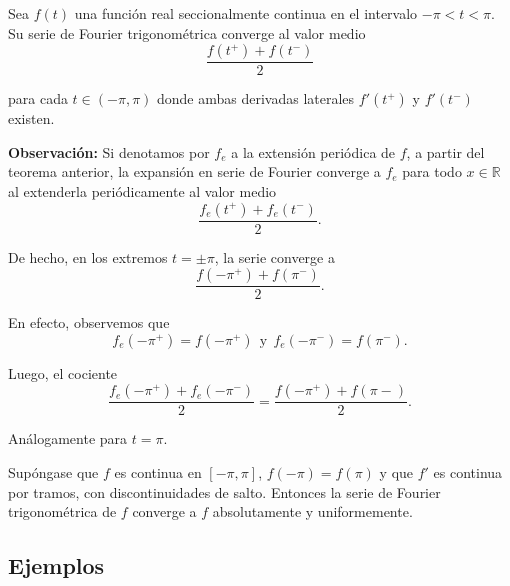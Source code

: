 \begin{teorema} \label{Puntual}
Sea $f(t)$ una función real seccionalmente continua en el intervalo $-\pi < t < \pi$. Su serie de Fourier trigonométrica converge al valor medio
\vspace{-0.05cm}
$$\frac{f(t^+) + f(t^-)}{2}$$

para cada $t \in (-\pi,\pi)$ donde ambas derivadas laterales $f'(t^+)$ y $f'(t^-)$ existen.
\end{teorema}

\textbf{Observación:} Si denotamos por $f_e$ a la extensión periódica de $f$, a partir del teorema anterior, la expansión en serie de Fourier converge a $f_e$ para todo $x \in \mathbb{R}$ al extenderla periódicamente al valor medio
$$\frac{f_e(t^+) + f_e(t^-)}{2}.$$

De hecho, en los extremos $t = \pm \pi$, la serie converge a 
$$\frac{f(-\pi^+) + f(\pi^-)}{2}.$$

En efecto, observemos que
$$f_e(-\pi^+) = f(-\pi^+) ~~\mbox{y}~~ f_e(-\pi^-) = f(\pi^-).$$

Luego, el cociente
$$\frac{f_e(-\pi^+) + f_e(-\pi^-)}{2} = \frac{f(-\pi^+) + f(\pi-)}{2}.$$

Análogamente para $t = \pi$.

\begin{teorema} \label{C.Uniforme}
Supóngase que $f$ es continua en $[-\pi,\pi]$, $f(-\pi) = f(\pi)$ y que $f'$ es continua por tramos, con discontinuidades de salto. Entonces la serie de Fourier trigonométrica de $f$ converge a $f$ absolutamente y uniformemente.
\end{teorema}

\subsection{Ejemplos}

